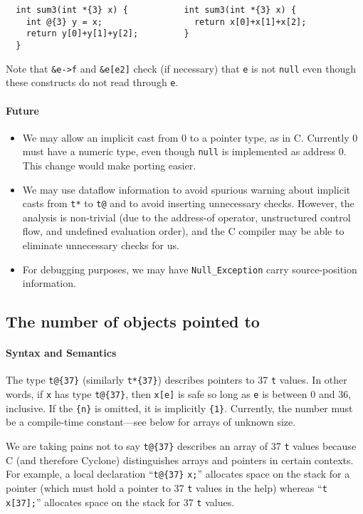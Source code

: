 \begin{verbatim}
  int sum3(int *{3} x) {           int sum3(int *{3} x) {
    int @{3} y = x;                  return x[0]+x[1]+x[2];
    return y[0]+y[1]+y[2];         }
  }
\end{verbatim}


Note that \texttt{\&e->f} and \texttt{\&e[e2]} check (if necessary) that
\texttt{e} is not \texttt{null} even though these constructs do not read
through \texttt{e}.

\paragraph{Future}

\begin{itemize}
\item We may allow an implicit cast from 0 to a pointer type, as in
  C\@.  Currently 0 must have a numeric type, even though \texttt{null}
  is implemented as address 0.  This change would make porting easier.
\item We may use dataflow information to avoid spurious warning about
  implicit casts from \texttt{t*} to \texttt{t@} and to avoid
  inserting unnecessary checks.  However, the analysis is
  non-trivial (due to the address-of operator, unstructured control
  flow, and undefined evaluation order), and the C compiler may be
  able to eliminate unnecessary checks for us.
\item For debugging purposes, we may have \texttt{Null_Exception}
  carry source-position information.
\end{itemize}

\subsection*{\hypertarget{pointer_bound}{The number of objects pointed to}}

\paragraph{Syntax and Semantics}
The type \verb|t@{37}| (similarly \verb|t*{37}|) describes pointers to
37 \texttt{t} values.  In other words, if \texttt{x} has type
\verb|t@{37}|, then \texttt{x[e]} is safe so long as \texttt{e} is between
0 and 36, inclusive.  If the \verb|{n}| is omitted, it is implicitly
\verb|{1}|.  Currently, the number must be a compile-time
constant---see below for arrays of unknown size.

We are taking pains not to say \verb|t@{37}| describes an array of 37
\texttt{t} values because C (and therefore Cyclone) distinguishes arrays
and pointers in certain contexts.  For example, a local declaration
``\verb|t@{37}| \texttt{x;}'' allocates space on the stack for a pointer
(which must hold a pointer to 37 \texttt{t} values in the help) whereas
``\texttt{t x[37];}'' allocates space on the stack for 37 \texttt{t}
values.



